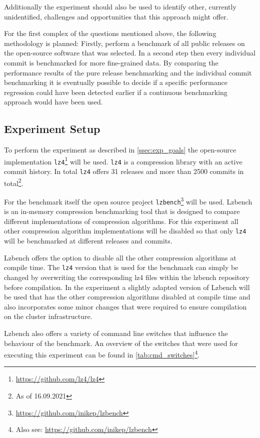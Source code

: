 \documentclass[	runningheads,
				a4paper]{llncs}
\begin{document}
	Additionally the experiment should also be used to identify other, currently unidentified, challenges and opportunities that this approach might offer.

	For the first complex of the questions mentioned above, the following methodology is planned: Firstly, perform a benchmark of all public releases on the open-source software that was selected. In a second step then every individual commit is benchmarked for more fine-grained data. By comparing the performance results of the pure release benchmarking and the individual commit benchmarking it is eventually possible to decide if a specific performance regression could have been detected earlier if a continuous benchmarking approach would have been used.

	\subsection{Experiment Setup}
	\label{ssec:exp_setup}
	
	To perform the experiment as described in \autoref{ssec:exp_goals} the open-source implementation \texttt{lz4}\footnote{\url{https://github.com/lz4/lz4}} will be used. \texttt{lz4} is a compression library with an active commit history. In total \texttt{lz4} offers 31 releases and more than 2500 commits in total\footnote{As of 16.09.2021}. 
	
	For the benchmark itself the open source project \texttt{lzbench}\footnote{\url{https://github.com/inikep/lzbench}} will be used. Lzbench is an in-memory compression benchmarking tool that is designed to compare different implementations of compression algorithms. For this experiment all other compression algorithm implementations will be disabled so that only \texttt{lz4} will be benchmarked at different releases and commits. 
	
	Lzbench offers the option to disable all the other compression algorithms at compile time. The \texttt{lz4} version that is used for the benchmark can simply be changed by overwriting the corresponding lz4 files within the lzbench repository before compilation. In the experiment a slightly adapted version of Lzbench will be used that has the other compression algorithms disabled at compile time and also incorporates some minor changes that were required to ensure compilation on the cluster infrastructure.

	Lzbench also offers a variety of command line switches that influence the behaviour of the benchmark. An overview of the switches that were used for executing this experiment can be found in \autoref{tab:cmd_switches}\footnote{Also see: \url{https://github.com/inikep/lzbench}}.
\end{document}
